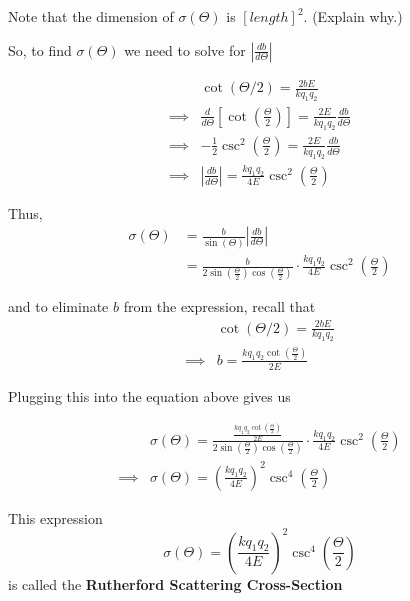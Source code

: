 \documentclass[11pt]{article}
\begin{document}
\vskip 0.5cm
\begin{thought}
  {Note that the dimension of $\sigma\left(\Theta\right)$ is $[length]^2$.} (Explain why.)
\end{thought}

\vskip 0.5cm
So, to find $\sigma\left(\Theta\right)$ we need to solve for $\left| \frac{db}{d\Theta} \right|$

\begin{align*}
  &\cot\left(\Theta/2\right) = \frac{2bE}{k q_1 q_2} \\
  \implies& \frac{d}{d\Theta} \left[ \cot \left(\frac{\Theta}{2}\right) \right] = \frac{2E}{k q_1 q_2} \frac{db}{d\Theta} \\
  \implies& -\frac{1}{2}\csc^2\left(\frac{\Theta}{2}\right) = \frac{2E}{k q_1 q_2} \frac{db}{d\Theta} \\
  \implies& \left| \frac{db}{d\Theta} \right| = \frac{k q_1 q_2}{4E} \csc^2 \left(\frac{\Theta}{2}\right)
\end{align*}

Thus,
\begin{align*}
  \sigma\left(\Theta\right) &= \frac{b}{\sin\left(\Theta\right)} \left| \frac{db}{d\Theta} \right| \\
  &= \frac{b}{2\sin\left(\frac{\Theta}{2}\right)\cos\left(\frac{\Theta}{2}\right)} \cdot \frac{k q_1 q_2}{4E} \csc^2 \left(\frac{\Theta}{2}\right) 
\end{align*}

and to eliminate $b$ from the expression, recall that 
\begin{align*}
  &\cot(\Theta/2) = \frac{2b E}{k q_1 q_2} \\
  \implies& b = \frac{k q_1 q_2 \cot\left(\frac{\Theta}{2}\right)}{2E}
\end{align*}

Plugging this into the equation above gives us 

\begin{align*}
  &\sigma\left(\Theta\right) =  \frac{\frac{k q_1 q_2 \cot\left(\frac{\Theta}{2}\right)}{2E} }{2\sin\left(\frac{\Theta}{2}\right)\cos\left(\frac{\Theta}{2}\right)} \cdot \frac{k q_1 q_2}{4E} \csc^2 \left(\frac{\Theta}{2}\right) \\
  \implies& \boxed{\sigma \left(\Theta\right) = \left(\frac{k q_1 q_2}{4E}\right)^2 \csc^4 \left( \frac{\Theta}{2} \right) }
\end{align*}

\begin{bluebox}
  This expression 
  \[ \sigma \left(\Theta\right) = \left(\frac{k q_1 q_2}{4E}\right)^2 \csc^4 \left( \frac{\Theta}{2} \right)  \]
  is called the \textbf{Rutherford Scattering Cross-Section}
\end{bluebox}
\end{document}
